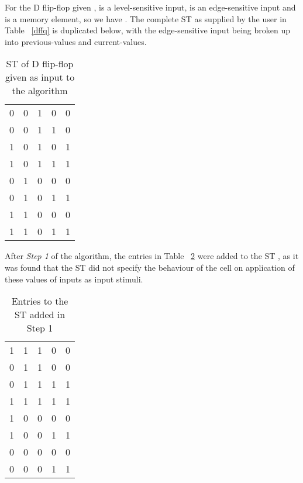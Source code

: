 \documentclass[final]{ieee}
\begin{document}
For the D flip-flop given ,  is a level-sensitive input,  is an edge-sensitive input and  is a memory element,  so we have . The complete ST as supplied by the user in Table ~\ref{dffq} is duplicated below, with the edge-sensitive input  being broken up into previous-values and current-values.

\begin{table}
\begin{center}
\begin{tabular}{|c|c|c|c|c|} \hline
 &  &  &  &  \\ \hline
0   &   0   &   1   &    0    & 0 \\
0   &   0   &   1   &    1    & 0 \\
1   &   0   &   1   &    0    & 1 \\
1   &   0   &   1   &    1    & 1 \\
0   &   1   &   0   &    0    & 0 \\
0   &   1   &   0   &    1    & 1 \\
1   &   1   &   0   &    0    & 0 \\
1   &   1   &   0   &    1    & 1 \\ \hline
\end{tabular}
\caption{ST of D flip-flop given as input to the algorithm} \label{dffq_2}
\end{center}
\end{table}

After \textit{Step 1} of the algorithm, the entries in Table ~\ref{dffq_new} were added to the ST , as it was found that the ST did not specify the behaviour of the cell on application of these values of inputs as input stimuli.

\begin{table}
\begin{center}
\begin{tabular}{|c|c|c|c|c|} \hline
 &  &  &  &  \\ \hline
1   &   1   &   1   &    0    & 0 \\
0   &   1   &   1   &    0    & 0 \\
0   &   1   &   1   &    1    & 1 \\
1   &   1   &   1   &    1    & 1 \\
1   &   0   &   0   &    0    & 0 \\
1   &   0   &   0   &    1    & 1 \\
0   &   0   &   0   &    0    & 0 \\
0   &   0   &   0   &    1    & 1 \\ \hline
\end{tabular}
\caption{Entries to the ST added in Step 1} \label{dffq_new}
\end{center}
\end{table} 
\end{document}
